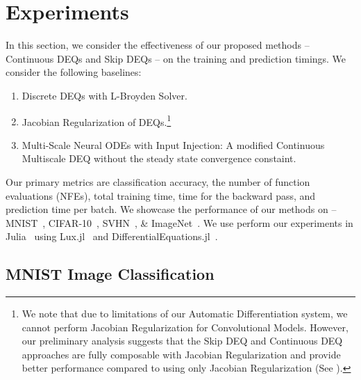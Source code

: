 \section{Experiments}
\label{sec:infinite_time_neural_odes_experiments}


In this section, we consider the effectiveness of our proposed methods -- Continuous DEQs and Skip DEQs -- on the training and prediction timings. We consider the following baselines:
%
\begin{enumerate}
    \item Discrete DEQs with L-Broyden Solver.
    \item Jacobian Regularization of DEQs.\footnote{We note that due to limitations of our Automatic Differentiation system, we cannot perform Jacobian Regularization for Convolutional Models. However, our preliminary analysis suggests that the Skip DEQ and Continuous DEQ approaches are fully composable with Jacobian Regularization and provide better performance compared to using only Jacobian Regularization (See ).}
    \item Multi-Scale Neural ODEs with Input Injection: A modified Continuous Multiscale DEQ without the steady state convergence constaint.
\end{enumerate}
%
Our primary metrics are classification accuracy, the number of function evaluations (NFEs), total training time, time for the backward pass, and prediction time per batch. We showcase the performance of our methods on -- MNIST~\citep{lecun1998gradient}, CIFAR-10~\citep{krizhevsky2009learning}, SVHN~\citep{netzer2011reading}, \& ImageNet~\citep{deng2009imagenet}. We use perform our experiments in Julia~\citep{Julia-2017} using Lux.jl~\citep{pal2022lux} and DifferentialEquations.jl~\citep{DifferentialEquations.jl-2017, rackauckas2018comparison, rackauckas2020universal}.

\subsection{MNIST Image Classification}
\label{subsec:infinite_time_neural_odes_mnist_image_classification}

